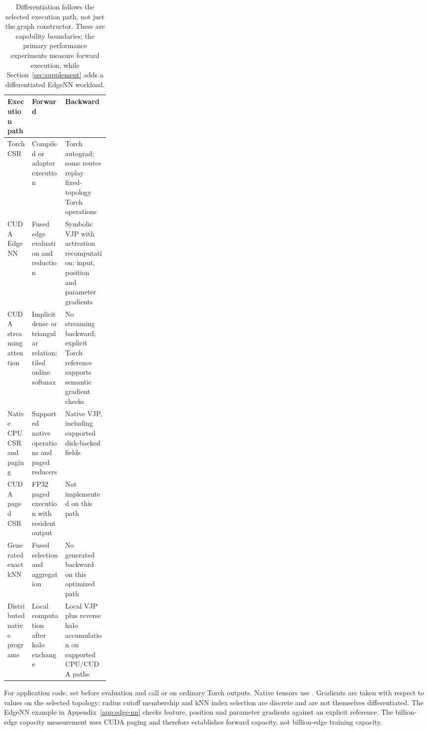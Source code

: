 \begin{table}[htbp]
\centering\small
\begin{tabularx}{\linewidth}{>{\raggedright\arraybackslash}p{0.24\linewidth} Y Y}
\toprule
Execution path & Forward & Backward \\
\midrule
Torch CSR & Compiled or adapter execution & Torch autograd; some routes replay fixed-topology Torch operations \\
CUDA EdgeNN & Fused edge evaluation and reduction & Symbolic VJP with activation recomputation; input, position and parameter gradients \\
CUDA streaming attention & Implicit dense or triangular relation; tiled online softmax & No streaming backward; explicit Torch reference supports semantic gradient checks \\
Native CPU CSR and paging & Supported native operations and paged reducers & Native VJP, including supported disk-backed fields \\
CUDA paged CSR & FP32 paged execution with resident output & Not implemented on this path \\
Generated exact kNN & Fused selection and aggregation & No generated backward on this optimized path \\
Distributed native programs & Local computation after halo exchange & Local VJP plus reverse halo accumulation on supported CPU/CUDA paths \\
\bottomrule
\end{tabularx}
\caption{Differentiation follows the selected execution path, not just the graph
constructor. These are capability boundaries; the primary performance
experiments measure forward execution, while Section~\ref{sec:supplement}
adds a differentiated EdgeNN workload.}
\label{tab:gradients}
\end{table}

For application code, set  before evaluation and call
 or  on ordinary Torch outputs.
Native tensors use . Gradients are taken with respect to
values on the selected topology: radius cutoff membership and kNN index
selection are discrete and are not themselves differentiated. The EdgeNN
example in Appendix~\ref{app:edge-nn} checks feature, position and parameter
gradients against an explicit reference. The billion-edge capacity measurement
uses CUDA paging and therefore establishes forward capacity, not billion-edge
training capacity.

